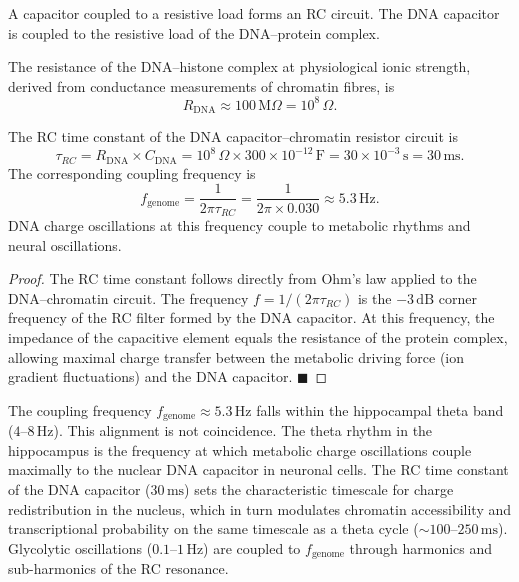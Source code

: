A capacitor coupled to a resistive load forms an RC circuit. The DNA
capacitor is coupled to the resistive load of the DNA--protein complex.

\begin{proposition}
\label{prop:dna_resistance}
The resistance of the DNA--histone complex at physiological ionic strength,
derived from conductance measurements of chromatin fibres, is
\begin{equation}
  R_{\mathrm{DNA}} \approx 100\,\mathrm{M}\Omega = 10^8\,\Omega.
  \label{eq:R_DNA}
\end{equation}
\end{proposition}

\begin{theorem}
\label{thm:metabolic_coupling}
The RC time constant of the DNA capacitor--chromatin resistor circuit is
\begin{equation}
  \tau_{RC} = R_{\mathrm{DNA}} \times C_{\mathrm{DNA}}
    = 10^8\,\Omega \times 300\times 10^{-12}\,\mathrm{F}
    = 30\times 10^{-3}\,\mathrm{s} = 30\,\mathrm{ms}.
  \label{eq:tau_RC}
\end{equation}
The corresponding coupling frequency is
\begin{equation}
  f_{\mathrm{genome}} = \frac{1}{2\pi\tau_{RC}}
    = \frac{1}{2\pi \times 0.030}
    \approx 5.3\,\mathrm{Hz}.
  \label{eq:f_genome}
\end{equation}
DNA charge oscillations at this frequency couple to metabolic rhythms
and neural oscillations.
\end{theorem}

\begin{proof}
The RC time constant follows directly from Ohm's law applied to the
DNA--chromatin circuit. The frequency $f = 1/(2\pi\tau_{RC})$ is the
$-3\,\mathrm{dB}$ corner frequency of the RC filter formed by the
DNA capacitor. At this frequency, the impedance of the capacitive element
equals the resistance of the protein complex, allowing maximal charge
transfer between the metabolic driving force (ion gradient fluctuations)
and the DNA capacitor. $\blacksquare$
\end{proof}

\begin{remark}
The coupling frequency $f_{\mathrm{genome}} \approx 5.3\,\mathrm{Hz}$
falls within the hippocampal theta band ($4$--$8\,\mathrm{Hz}$).
This alignment is not coincidence. The theta rhythm in the hippocampus
is the frequency at which metabolic charge oscillations couple maximally
to the nuclear DNA capacitor in neuronal cells. The RC time constant of
the DNA capacitor ($30\,\mathrm{ms}$) sets the characteristic timescale
for charge redistribution in the nucleus, which in turn modulates
chromatin accessibility and transcriptional probability on the same
timescale as a theta cycle ($\sim 100$--$250\,\mathrm{ms}$).
Glycolytic oscillations ($0.1$--$1\,\mathrm{Hz}$) are coupled to
$f_{\mathrm{genome}}$ through harmonics and sub-harmonics of the
RC resonance.
\end{remark}

